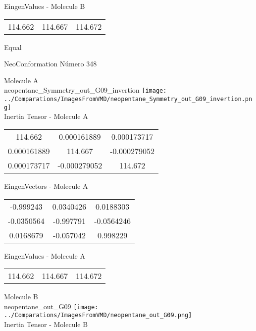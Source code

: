 \begin{multicols}{2}
\begin{center}
\vtab
 EingenValues - Molecule B     \\
\vtab
\begin{tabular}{|c c c|}
114.662	 & 	114.667	 & 	114.672	 \\
\end{tabular}

\end{center}
\end{multicols}
\begin{center}
\vtab
\vtab
\textcolor{NavyBlue}{\Large Equal}
\end{center}

 \newpage

\vtab[-2cm]
\begin{center}
{\large NeoConformation \tab Número 348}
\end{center}
\begin{multicols}{2}
\begin{center}

Molecule A \\ 
neopentane\_Symmetry\_out\_G09\_invertion
\texttt{[image: ../Comparations/ImagesFromVMD/neopentane\_Symmetry\_out\_G09\_invertion.png]}
\\
Inertia Tensor - Molecule A \\
\vtab

\begin{tabular}{|c c c|}
114.662	 & 	0.000161889	 & 	0.000173717	 \\
0.000161889	 & 	114.667	 & 	-0.000279052	 \\
0.000173717	 & 	-0.000279052	 & 	114.672
\end{tabular}

\vtab
 EingenVectors - Molecule A     \\
\vtab
\begin{tabular}{|c c c|}
-0.999243	 & 	0.0340426	 & 	0.0188303	 \\
-0.0350564	 & 	-0.997791	 & 	-0.0564246	 \\
0.0168679	 & 	-0.057042	 & 	0.998229
\end{tabular}

\vtab
 EingenValues - Molecule A     \\
\vtab
\begin{tabular}{|c c c|}
114.662	 & 	114.667	 & 	114.672	 \\
\end{tabular}
\columnbreak

Molecule B \\ 
neopentane\_out\_G09
\texttt{[image: ../Comparations/ImagesFromVMD/neopentane\_out\_G09.png]}
\\
Inertia Tensor - Molecule B \\
\vtab


\end{center}
\end{multicols}
